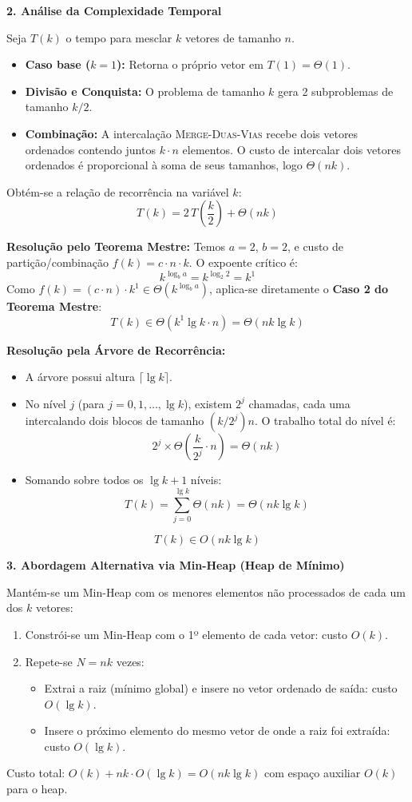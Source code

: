 \documentclass[11pt,a4paper]{article}
\newcommand{\res}[1]{\[\boxed{#1}\]}
\newcommand{\topico}[1]{\par\medskip\textbf{\color{azul}#1}\par}
\begin{document}
\topico{2. Análise da Complexidade Temporal}
Seja $T(k)$ o tempo para mesclar $k$ vetores de tamanho $n$.
\begin{itemize}
  \item \textbf{Caso base ($k=1$):} Retorna o próprio vetor em $T(1) = \Theta(1)$.
  \item \textbf{Divisão e Conquista:} O problema de tamanho $k$ gera 2 subproblemas de tamanho $k/2$.
  \item \textbf{Combinação:} A intercalação \textsc{Merge-Duas-Vias} recebe dois vetores ordenados contendo juntos $k \cdot n$ elementos. O custo de intercalar dois vetores ordenados é proporcional à soma de seus tamanhos, logo $\Theta(nk)$.
\end{itemize}
Obtém-se a relação de recorrência na variável $k$:
\[
T(k) = 2\,T\left(\frac{k}{2}\right) + \Theta(nk)
\]

\textbf{Resolução pelo Teorema Mestre:}
Temos $a = 2$, $b = 2$, e custo de partição/combinação $f(k) = c \cdot n \cdot k$.
O expoente crítico é:
\[
k^{\log_b a} = k^{\log_2 2} = k^1
\]
Como $f(k) = (c \cdot n) \cdot k^1 \in \Theta(k^{\log_b a})$, aplica-se diretamente o \textbf{Caso 2 do Teorema Mestre}:
\[
T(k) \in \Theta(k^1 \lg k \cdot n) = \Theta(nk \lg k)
\]

\textbf{Resolução pela Árvore de Recorrência:}
\begin{itemize}
  \item A árvore possui altura $\lceil \lg k \rceil$.
  \item No nível $j$ (para $j = 0, 1, \dots, \lg k$), existem $2^j$ chamadas, cada uma intercalando dois blocos de tamanho $(k/2^j)n$. O trabalho total do nível é:
  \[
  2^j \times \Theta\left(\frac{k}{2^j} \cdot n\right) = \Theta(nk)
  \]
  \item Somando sobre todos os $\lg k + 1$ níveis:
  \[
  T(k) = \sum_{j=0}^{\lg k} \Theta(nk) = \Theta(nk \lg k)
  \]
\end{itemize}
\res{T(k) \in O(nk \lg k)}

\topico{3. Abordagem Alternativa via Min-Heap (Heap de Mínimo)}
Mantém-se um Min-Heap com os menores elementos não processados de cada um dos $k$ vetores:
\begin{enumerate}
  \item Constrói-se um Min-Heap com o 1º elemento de cada vetor: custo $O(k)$.
  \item Repete-se $N = nk$ vezes:
  \begin{itemize}
    \item Extrai a raiz (mínimo global) e insere no vetor ordenado de saída: custo $O(\lg k)$.
    \item Insere o próximo elemento do mesmo vetor de onde a raiz foi extraída: custo $O(\lg k)$.
  \end{itemize}
\end{enumerate}
Custo total: $O(k) + nk \cdot O(\lg k) = O(nk \lg k)$ com espaço auxiliar $O(k)$ para o heap.
\end{document}
